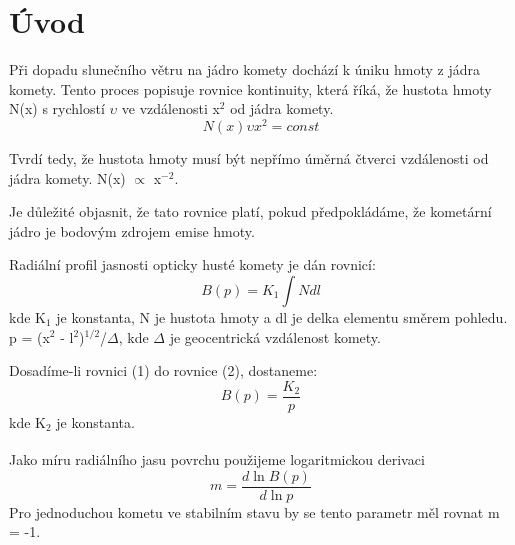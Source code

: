 \documentclass[a4paper,11pt]{article}
\begin{document}
\begin{minipage}[t]{0.5\textwidth}
        \section{Úvod} 
        Při dopadu slunečního větru na jádro komety dochází k úniku hmoty z jádra komety. Tento proces popisuje rovnice kontinuity, která říká, že hustota hmoty N(x) s rychlostí $\upsilon$ ve vzdálenosti x$^2$ od jádra komety.
        \begin{equation}
            N(x) \upsilon x^2 = const
        \end{equation}
        \par Tvrdí tedy, že hustota hmoty musí být nepřímo úměrná čtverci vzdálenosti od jádra komety. N(x) $\propto$  x$^{-2}$.
        \par Je důležité objasnit, že tato rovnice platí, pokud předpokládáme, že kometární jádro je bodovým zdrojem emise hmoty. 
        \par Radiální profil jasnosti opticky husté komety je dán rovnicí:
        \begin{equation}
            B(p) = K_1 \int N dl
        \end{equation}
        kde K$_1$ je konstanta, N je hustota hmoty a dl je delka elementu směrem pohledu. p = (x$^2$ - l$^2$)$^{1/2}$/$\Delta$, kde $\Delta$ je geocentrická vzdálenost komety.
        \par Dosadíme-li rovnici (1) do rovnice (2), dostaneme: 
        \begin{equation}
            B(p) = \frac{K_2}{p}
        \end{equation}
        kde K$_2$ je konstanta.
        \par Jako míru radiálního jasu povrchu použijeme logaritmickou derivaci \textsuperscript{\cite{jewitt}}
        \begin{equation}
            m = \frac{d \ln B(p)}{d \ln p}
        \end{equation} 
        Pro jednoduchou kometu ve stabilním stavu by se tento parametr měl rovnat m = -1.


    \end{minipage}
    \hspace{10pt}
\end{document}
